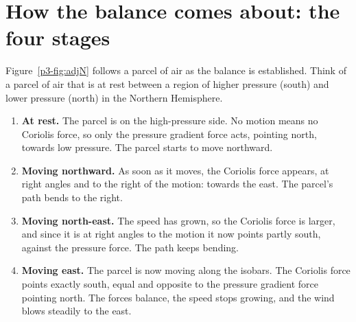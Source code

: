 \section{How the balance comes about: the four stages}

Figure~\ref{p3-fig:adjN} follows a parcel of air as the balance is established. Think of a parcel of air that is at rest between a region of higher pressure (south) and lower pressure (north) in the Northern Hemisphere.

\begin{enumerate}[label=\textbf{Stage \arabic*.},leftmargin=*,itemsep=4pt]
\item \textbf{At rest.} The parcel is on the high-pressure side. No motion means no Coriolis force, so only the pressure gradient force acts, pointing north, towards low pressure. The parcel starts to move northward.
\item \textbf{Moving northward.} As soon as it moves, the Coriolis force appears, at right angles and to the right of the motion: towards the east. The parcel's path bends to the right.
\item \textbf{Moving north-east.} The speed has grown, so the Coriolis force is larger, and since it is at right angles to the motion it now points partly south, against the pressure force. The path keeps bending.
\item \textbf{Moving east.} The parcel is now moving along the isobars. The Coriolis force points exactly south, equal and opposite to the pressure gradient force pointing north. The forces balance, the speed stops growing, and the wind blows steadily to the east.
\end{enumerate}

